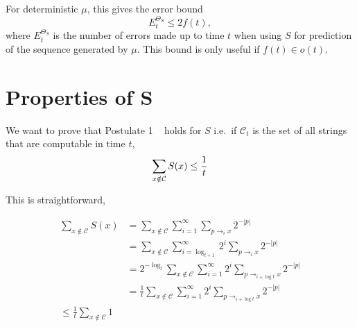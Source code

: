 \documentclass[a4paper]{article}
\def\X{\mathcal{X}}
\def\C{\mathcal{C}}
\begin{document}
For deterministic $\mu$,
this gives the error bound~\cite[Thm.\ 3.36]{Hutter:2005}
\[
E_t^{\Theta_S} \leq 2f(t),
\]
where $E_t^{\Theta_S}$ is the number of errors made up to time $t$
when using $S$ for prediction of the sequence generated by $\mu$.
This bound is only useful if $f(t) \in o(t)$.




\section{Properties of S}

We want to prove that Postulate 1 ~\cite{Schmidhuber:2002} holds for $S$ i.e.\ if $\C_t$ is the set of all strings that are computable in time $t$, 
\begin{equation}
\sum_{x\notin \C} S(x) \leq \frac{1}{t} \\ 
\end{equation}

This is straightforward,

\begin{align*}
 \sum_{x\notin \C} S(x) &= \sum_{x\notin \C} \sum_{i=1}^{\infty}\sum_{p\rightarrow_i x} 2^{-|p|}\\
			&= \sum_{x\notin \C} \sum_{i=\log_{t+1}}^{\infty} 2^i \sum_{p\rightarrow_i x} 2^{-|p|}\\
			&= 2^{-\log_t}\sum_{x\notin \C} \sum_{i=1}^{\infty} 2^i \sum_{p\rightarrow_{i+\log t} x} 2^{-|p|}\\
			&= \frac{1}{t}\sum_{x\notin \C} \sum_{i=1}^{\infty} 2^i \sum_{p\rightarrow_{i+\log t} x} 2^{-|p|}\\
			\leq \frac{1}{t}\sum_{x\notin \C} 1 
\end{align*}








\end{document}
